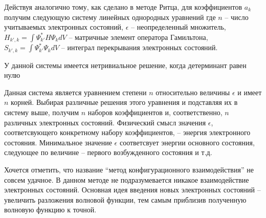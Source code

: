 Действуя аналогично тому, как сделано в методе Ритца, для коэффициентов $a_k$ получим следующую систему линейных однородных уравнений
где $n$ -- число учитываемых электронных состояний, $\epsilon$ -- неопределенный множитель, $H_{k', k} = \int\Psi_{k'}^{\ast}H\Psi_{k}dV$ -- матричные элемент оператора Гамильтона, $S_{k', k} = \int\Psi_{k'}^{\ast}\Psi_{k}dV$ -- интеграл перекрывания электронных состояний.

У данной системы имеется нетривиальное решение, когда детерминант равен нулю

Данная система является уравнением степени $n$ относительно величины $\epsilon$ и имеет $n$ корней. Выбирая различные решения этого уравнения и подставляя их в систему выше, получим $n$ наборов коэффициентов и, соответственно, $n$ различных электронных состояний. Физический смысл значения $\epsilon$, соответсвующего конкретному набору коэффициентов, -- энергия электронного состояния. Минимальное значение $\epsilon$ соответсвует энергии основного состояния, следующее по величине -- первого возбужденного состояния и т.д.

Хочется отметить, что название “метод конфигурационного взаимодействия” не совсем удачное. В данном методе не подразумевается никакое взаимодействие электронных состояний. Основная идея введения новых электронных состояний -- увеличить разложения волновой функции, тем самым приблизив полученную волновую функцию к точной.